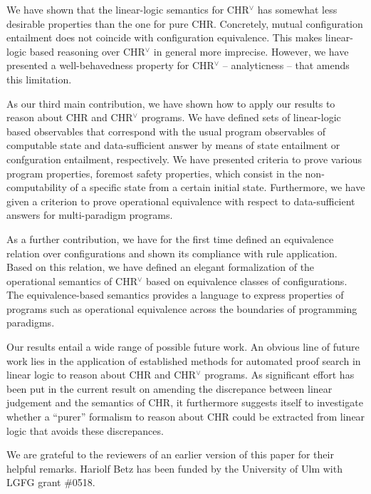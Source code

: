 \documentclass[acmtocl]{acmtrans2m}
\begin{document}
We have shown that the linear-logic semantics for CHR$^\vee$ has somewhat less
desirable properties than the one for pure CHR. Concretely, mutual configuration
entailment does not coincide with configuration equivalence. This makes
linear-logic based reasoning over CHR$^\vee$ in general more imprecise. However,
we have presented a well-behavedness property for CHR$^\vee$ -- analyticness --
that amends this limitation.

As our third main contribution, we have shown how to apply our results to reason
about CHR and CHR$^\vee$ programs. We have defined sets of linear-logic based
observables that correspond with the usual program observables of computable
state and data-sufficient answer by means of state entailment or confguration
entailment, respectively. We have presented criteria to prove various program
properties, foremost safety properties, which consist in the non-computability of
a specific state from a certain initial state. Furthermore, we have given a
criterion to prove operational equivalence with respect to data-sufficient
answers for multi-paradigm programs.

As a further contribution, we have for the first time defined an equivalence
relation over configurations and shown its compliance with rule application.
Based on this relation, we have defined an elegant formalization of the
operational semantics of CHR$^\vee$ based on equivalence classes of
configurations. The equivalence-based semantics provides a language to express
properties of programs such as operational equivalence across the boundaries of
programming paradigms.

Our results entail a wide range of possible future work. An obvious line of
future work lies in the application of established methods for automated proof
search in linear logic to reason about CHR and CHR$^\vee$ programs. As
significant effort has been put in the current result on amending the discrepance
between linear judgement and the semantics of CHR, it furthermore suggests itself
to investigate whether a ``purer'' formalism to reason about CHR could be
extracted from linear logic that avoids these discrepances.

\begin{acks} We are grateful to the reviewers of an earlier version of this paper
for their helpful remarks. Hariolf Betz has been funded by the University of Ulm
with LGFG grant \#0518.
\end{acks}



\end{document}
